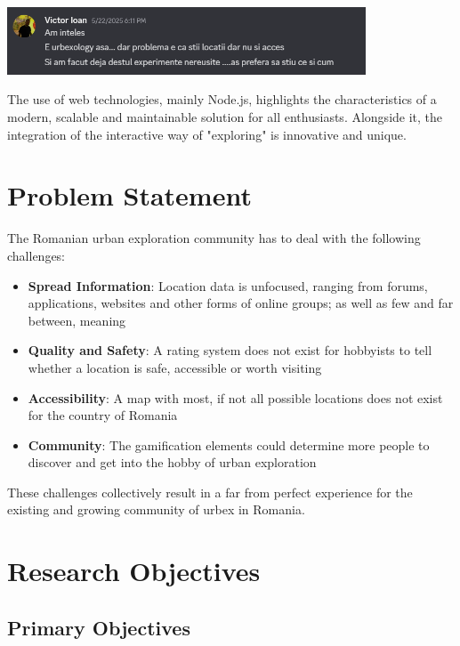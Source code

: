 \documentclass[12pt,a4paper]{report}
\begin{document}
\begin{center}
\includegraphics[width=0.8\textwidth]{images/mesaj.png}
\end{center}

The use of web technologies, mainly Node.js, highlights the characteristics of a modern, scalable and maintainable solution for all enthusiasts. Alongside it, the integration of the interactive way of "exploring" is innovative and unique.



\section*{Problem Statement}

The Romanian urban exploration community has to deal with the following challenges:

\begin{itemize}
    \item \textbf{Spread Information}: Location data is unfocused, ranging from forums, applications, websites and other forms of online groups; as well as few and far between, meaning  
    
    \item \textbf{Quality and Safety}: A rating system does not exist for hobbyists to tell whether a location is safe, accessible or worth visiting
    
    \item \textbf{Accessibility}: A map with most, if not all possible locations does not exist for the country of Romania
    
    \item \textbf{Community}: The gamification elements could determine more people to discover and get into the hobby of urban exploration 
\end{itemize}

These challenges collectively result in a far from perfect experience for the existing and growing community of urbex in Romania.

\section*{Research Objectives}

\subsection*{Primary Objectives}
\end{document}
